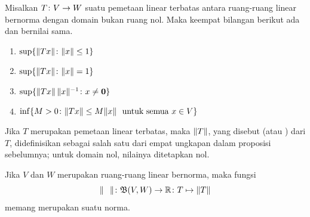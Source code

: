 \begin{prop} Misalkan $T\colon V \rightarrow W$ suatu pemetaan linear terbatas antara ruang-ruang
linear bernorma dengan domain bukan ruang nol. Maka keempat bilangan berikut ada dan bernilai sama.
 \begin{enumerate}[label=\rm{(\alph*)}]
  \item $\sup\{\lVert Tx\rVert\colon \lVert x\rVert \le 1\}$
  \item $\sup\{\lVert Tx\rVert\colon \lVert x\rVert = 1\}$
  \item $\sup\{\lVert Tx\rVert\,\lVert x\rVert^{-1}\colon x \ne \mathbf{0}\}$
  \item $\inf\{M > 0\colon \lVert Tx\rVert \le M\lVert x\rVert\ \text{ untuk semua $x \in V$}\}$
 \end{enumerate}
\end{prop}

\begin{defn}\label{defn_op_norm} Jika $T$ merupakan pemetaan linear terbatas, maka
$\lVert T\rVert$, yang disebut
 (atau
) dari $T$, didefinisikan sebagai salah satu dari empat ungkapan dalam
proposisi sebelumnya; untuk domain nol, nilainya ditetapkan nol.
\end{defn}

\begin{exam}\label{exam_op_norm_norm} Jika $V$ dan $W$ merupakan ruang-ruang linear
bernorma, maka fungsi
   \[ \lVert\hphantom{T}\rVert\colon \mathfrak{B}(V,W) \rightarrow \mathbb{R}
      \colon T \mapsto \lVert T\rVert \]
memang merupakan suatu norma.
\end{exam}


